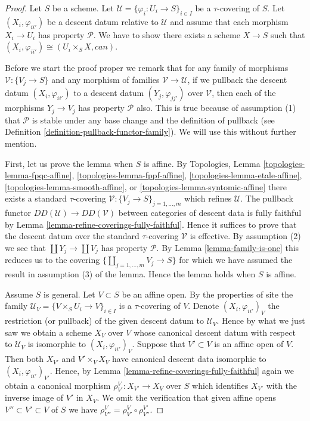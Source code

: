 \begin{proof}
Let $S$ be a scheme.
Let $\mathcal{U} = \{\varphi_i : U_i \to S\}_{i \in I}$
be a $\tau$-covering of $S$.
Let $(X_i, \varphi_{ii'})$ be a descent datum relative to
$\mathcal{U}$ and assume that each morphism $X_i \to U_i$ has property
$\mathcal{P}$. We have to show there exists a scheme $X \to S$ such that
$(X_i, \varphi_{ii'}) \cong (U_i \times_S X, can)$.

\medskip\noindent
Before we start the proof proper we remark that for any
family of morphisms $\mathcal{V} : \{V_j \to S\}$ and any
morphism of families $\mathcal{V} \to \mathcal{U}$, if we pullback
the descent datum $(X_i, \varphi_{ii'})$ to a descent datum
$(Y_j, \varphi_{jj'})$ over $\mathcal{V}$, then each of the
morphisms $Y_j \to V_j$ has property $\mathcal{P}$ also.
This is true because of assumption (1) that $\mathcal{P}$ is stable
under any base change and the definition of pullback
(see Definition \ref{definition-pullback-functor-family}).
We will use this without further mention.

\medskip\noindent
First, let us prove the lemma when $S$ is affine.
By Topologies, Lemma
\ref{topologies-lemma-fpqc-affine},
\ref{topologies-lemma-fppf-affine},
\ref{topologies-lemma-etale-affine},
\ref{topologies-lemma-smooth-affine}, or
\ref{topologies-lemma-syntomic-affine}
there exists a standard $\tau$-covering
$\mathcal{V} : \{V_j \to S\}_{j = 1, \ldots, m}$
which refines $\mathcal{U}$. The pullback functor
$DD(\mathcal{U}) \to DD(\mathcal{V})$
between categories of descent data is fully faithful
by Lemma \ref{lemma-refine-coverings-fully-faithful}.
Hence it suffices to prove that the descent datum over
the standard $\tau$-covering $\mathcal{V}$ is effective.
By assumption (2) we see that $\coprod Y_j \to \coprod V_j$
has property $\mathcal{P}$.
By Lemma \ref{lemma-family-is-one} this reduces us to the covering
$\{\coprod_{j = 1, \ldots, m} V_j \to S\}$ for which we have
assumed the result in assumption (3) of the lemma.
Hence the lemma holds when $S$ is affine.

\medskip\noindent
Assume $S$ is general. Let $V \subset S$ be an affine open.
By the properties of site the family
$\mathcal{U}_V = \{V \times_S U_i \to V\}_{i \in I}$ is a
$\tau$-covering of $V$. Denote
$(X_i, \varphi_{ii'})_V$ the restriction (or pullback) of
the given descent datum to $\mathcal{U}_V$.
Hence by what we just saw we obtain a scheme $X_V$ over $V$
whose canonical descent datum with respect to
$\mathcal{U}_V$ is isomorphic to $(X_i, \varphi_{ii'})_V$.
Suppose that $V' \subset V$ is an affine open of $V$.
Then both $X_{V'}$ and $V' \times_V X_V$ have canonical
descent data isomorphic to $(X_i, \varphi_{ii'})_{V'}$.
Hence, by Lemma \ref{lemma-refine-coverings-fully-faithful}
again we obtain a canonical morphism
$\rho^V_{V'} : X_{V'} \to X_V$ over $S$ which identifies
$X_{V'}$ with the inverse image of $V'$ in $X_V$.
We omit the verification that given affine opens
$V'' \subset V' \subset V$ of $S$ we have
$\rho^V_{V''} = \rho^V_{V'} \circ \rho^{V'}_{V''}$.


\end{proof}
